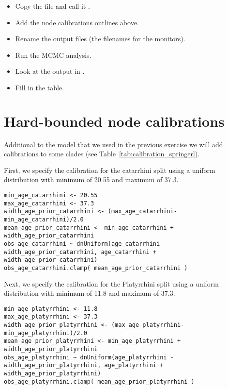 \begin{itemize}
\item Copy the file  and call it .
\item Add the node calibrations outlines above.
\item Rename the output files (\IE the filenames for the monitors).
\item Run the MCMC analysis.
\item Look at the output in \Tracer.
\item Fill in the table.
\end{itemize}




\newpage
\section{Hard-bounded node calibrations}\label{sec:HardBounds}
Additional to the model that we used in the previous exercise we will add calibrations to some clades (see Table~\ref{tab:calibration_springer}).

First, we specify the calibration for the catarrhini split using a uniform distribution with minimum of 20.55 and maximum of 37.3.
{\tt \begin{snugshade*}
\begin{lstlisting}
min_age_catarrhini <- 20.55
max_age_catarrhini <- 37.3
width_age_prior_catarrhini <- (max_age_catarrhini-min_age_catarrhini)/2.0
mean_age_prior_catarrhini <- min_age_catarrhini + width_age_prior_catarrhini
obs_age_catarrhini ~ dnUniform(age_catarrhini - width_age_prior_catarrhini, age_catarrhini + width_age_prior_catarrhini)
obs_age_catarrhini.clamp( mean_age_prior_catarrhini )
\end{lstlisting}
\end{snugshade*}}

Next, we specify the calibration for the Platyrrhini split using a uniform distribution with minimum of 11.8 and maximum of 37.3.
{\tt \begin{snugshade*}
\begin{lstlisting}
min_age_platyrrhini <- 11.8
max_age_platyrrhini <- 37.3
width_age_prior_platyrrhini <- (max_age_platyrrhini-min_age_platyrrhini)/2.0
mean_age_prior_platyrrhini <- min_age_platyrrhini + width_age_prior_platyrrhini
obs_age_platyrrhini ~ dnUniform(age_platyrrhini - width_age_prior_platyrrhini, age_platyrrhini + width_age_prior_platyrrhini)
obs_age_platyrrhini.clamp( mean_age_prior_platyrrhini )
\end{lstlisting}
\end{snugshade*}}

